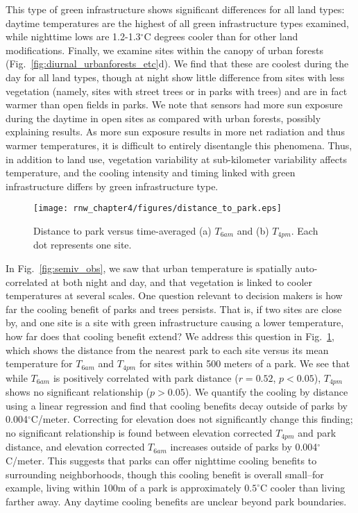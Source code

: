 This type of green infrastructure shows significant differences for all land types: daytime temperatures are the highest of all green infrastructure types examined, while nighttime lows are 1.2-1.3$^\circ$C degrees cooler than for other land modifications. 
Finally, we examine sites within the canopy of urban forests (Fig.~\ref{fig:diurnal_urbanforests_etc}d). 
We find that these are coolest during the day for all land types, though at night show little difference from sites with less vegetation (namely, sites with street trees or in parks with trees) and are in fact warmer than open fields in parks. 
We note that sensors had more sun exposure during the daytime in open sites as compared with urban forests, possibly explaining results. As more sun exposure results in more net radiation and thus warmer temperatures, it is difficult to entirely disentangle this phenomena. 
Thus, in addition to land use, vegetation variability at sub-kilometer variability affects temperature, and the cooling intensity and timing linked with green infrastructure differs by green infrastructure type. 

\begin{figure}
\centering
\texttt{[image: rnw\_chapter4/figures/distance\_to\_park.eps]}
\caption{Distance to park versus time-averaged (a) $T_{6am}$ and (b) $T_{4pm}$. Each dot represents one site.}
\label{fig:park_distance}
\end{figure}

In Fig.~\ref{fig:semiv_obs}, we saw that urban temperature is spatially auto-correlated at both night and day, and that vegetation is linked to cooler temperatures at several scales. One question relevant to decision makers is how far the cooling benefit of parks and trees persists. That is, if two sites are close by, and one site is a site with green infrastructure causing a lower temperature, how far does that cooling benefit extend? 
We address this question in Fig.~\ref{fig:park_distance}, which shows the distance from the nearest park to each site versus its mean temperature for $T_{6am}$ and $T_{4pm}$ for sites within 500 meters of a park. We see that while $T_{6am}$ is positively correlated with park distance ($r=0.52$, $p< 0.05$), $T_{4pm}$ shows no significant relationship ($p>0.05$).  We quantify the cooling by distance using a linear regression and find that cooling benefits decay outside of parks by 0.004$^\circ$C/meter. 
Correcting for elevation does not significantly change this finding; no significant relationship is found between elevation corrected $T_{4pm}$ and park distance, and elevation corrected $T_{6am}$ increases outside of parks by 0.004$^\circ$C/meter.  
This suggests that parks can offer nighttime cooling benefits to surrounding neighborhoods, though this cooling benefit is overall small--for example, living within 100m of a park is approximately $0.5^\circ$C cooler than living farther away. Any daytime cooling benefits are unclear beyond park boundaries. 

